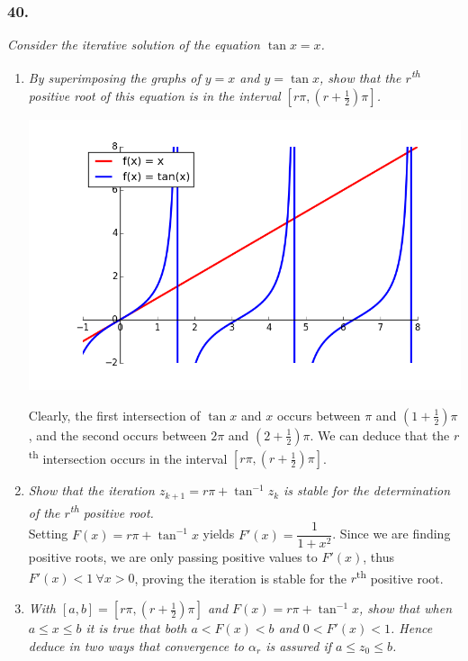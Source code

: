 \documentclass[12pt]{article}
\begin{document}
\subsubsection*{40.}
{\it Consider the iterative solution of the equation $\tan{x} = x$.}
\begin{enumerate}[\it\ \ (a)\ \ ]
\item {\it By superimposing the graphs of $y=x$ and $y=\tan{x}$, show that the $r$\textsuperscript{th} positive root of this equation is in the interval $[r\pi, (r + \frac{1}{2})\pi]$.}\\
\centerline{\includegraphics[scale=0.85]{tangent_graph.png}}
Clearly, the first intersection of $\tan{x}$ and $x$ occurs between $\pi$ and $(1 + \frac{1}{2})\pi$, and the second occurs between $2\pi$ and $(2 + \frac{1}{2})\pi$.  We can deduce that the $r$\textsuperscript{th} intersection occurs in the interval $[r\pi, (r + \frac{1}{2})\pi]$.

\item {\it Show that the iteration $z_{k+1} = r\pi + \tan^{-1}{z_k}$ is stable for the determination of the $r$\textsuperscript{th} positive root.}\\

\noindent Setting $F(x) = r\pi + \tan^{-1}{x}$ yields $F'(x) = \dfrac{1}{1 + x^2}$.  Since we are finding positive roots, we are only passing positive values to $F'(x)$, thus $F'(x) < 1\ \forall x > 0$, proving the iteration is stable for the $r$\textsuperscript{th} positive root.

\item {\it With $[a,b] = [r\pi, (r + \frac{1}{2})\pi]$ and $F(x) = r\pi + \tan^{-1}{x}$, show that when $a \leq x \leq b$ it is true that both $a < F(x) < b$ and $0 < F'(x) < 1$.  Hence deduce in two ways that convergence to $\alpha_r$ is assured if $a \leq z_0 \leq b$.}\\


\end{enumerate}
\end{document}
